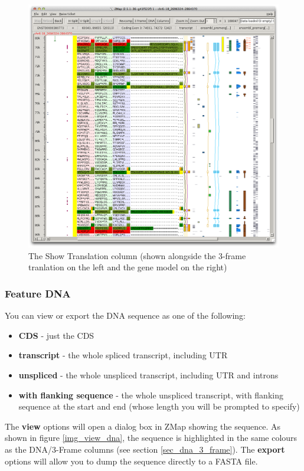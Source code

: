 \documentclass[letterpaper]{article}
\begin{document}
\begin{figure}
\centering
\color[rgb]{0.30980393,0.5058824,0.7411765}
\includegraphics[width=15.231cm]{images/show_translation.png}
\caption{The Show Translation column (shown alongside the 3-frame tranlation on the left and the gene model on the right)}
\label{img_show_translation}
\end{figure}

\subsubsection{Feature DNA} \label{sec_feature_dna}
You can view or export the DNA sequence as one of the following:

\begin{itemize}
\item \textbf{CDS} - just the CDS
\item \textbf{transcript} - the whole spliced transcript, including UTR
\item \textbf{unspliced} - the whole unspliced transcript, including UTR and introns
\item \textbf{with flanking sequence} - the whole unspliced transcript, with flanking sequence at the start and end (whose length you will be prompted to specify)
\end{itemize}

The \textbf{view} options will open a dialog box in ZMap showing the sequence. As shown in figure \ref{img_view_dna}, the sequence is highlighted in the same colours as the DNA/3-Frame columns (see section \ref{sec_dna_3_frame}). The \textbf{export} options will allow you to dump the sequence directly to a FASTA file.
\end{document}
